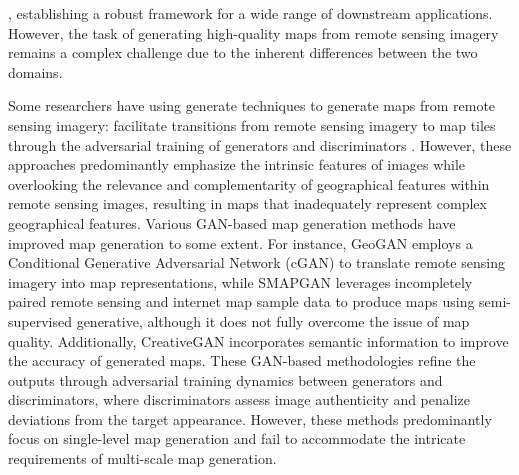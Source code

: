 \cite{Muhtar2024LHRSBotEmpoweringRemote,Zhang2024EarthGPTUniversalMultimodal,Kuckreja2024GeoChatGroundedLarge,Guo2024SkySenseMultiModalRemote,Mall2023RemoteSensingVisionLanguage}, establishing a robust framework for a wide range of downstream applications. However, the task of generating high-quality maps from remote sensing imagery remains a complex challenge due to the inherent differences between the two domains.

Some researchers have using generate techniques to generate maps from remote sensing imagery: facilitate transitions from remote sensing imagery to map tiles through the adversarial training of generators and discriminators \cite{Isola2017ImagetoImageTranslationConditional}. However, these approaches predominantly emphasize the intrinsic features of images while overlooking the relevance and complementarity of geographical features within remote sensing images, resulting in maps that inadequately represent complex geographical features. Various GAN-based map generation methods have improved map generation to some extent. For instance, GeoGAN \cite{Ganguli2019GeoGANConditionalGAN} employs a Conditional Generative Adversarial Network (cGAN) \cite{Wang2018HighResolutionImageSynthesis} to translate remote sensing imagery into map representations, while SMAPGAN \cite{Chen2021SMAPGANgenerativeadversarial} leverages incompletely paired remote sensing and internet map sample data to produce maps using semi-supervised generative, although it does not fully overcome the issue of map quality. Additionally, CreativeGAN \cite{Fu2021TranslationAerialImage} incorporates semantic information to improve the accuracy of generated maps. These GAN-based methodologies refine the outputs through adversarial training dynamics between generators and discriminators, where discriminators assess image authenticity and penalize deviations from the target appearance. However, these methods predominantly focus on single-level map generation and fail to accommodate the intricate requirements of multi-scale map generation.

